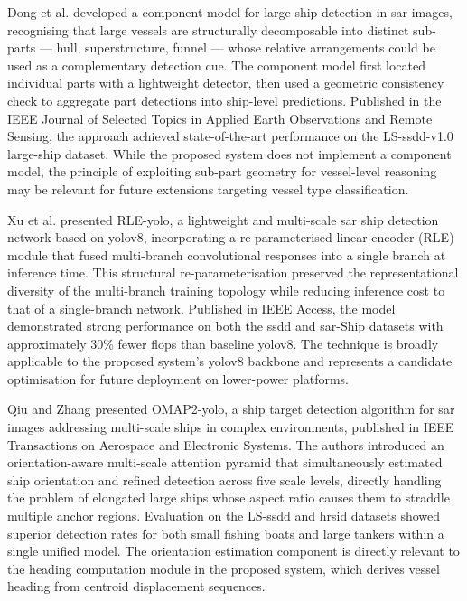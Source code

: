 Dong et al. \cite{Dong2025} developed a component model for large ship detection
in \gls{sar} images, recognising that large vessels are structurally decomposable into
distinct sub-parts --- hull, superstructure, funnel --- whose relative arrangements
could be used as a complementary detection cue. The component model first located
individual parts with a lightweight detector, then used a geometric consistency
check to aggregate part detections into ship-level predictions. Published in the
IEEE Journal of Selected Topics in Applied Earth Observations and Remote Sensing,
the approach achieved state-of-the-art performance on the LS-\gls{ssdd}-v1.0 large-ship
dataset. While the proposed system does not implement a component model, the
principle of exploiting sub-part geometry for vessel-level reasoning may be
relevant for future extensions targeting vessel type classification.
 
Xu et al. \cite{Xu2025} presented RLE-\gls{yolo}, a lightweight and multi-scale \gls{sar}
ship detection network based on \gls{yolov8}, incorporating a re-parameterised linear
encoder (RLE) module that fused multi-branch convolutional responses into a single
branch at inference time. This structural re-parameterisation preserved the
representational diversity of the multi-branch training topology while reducing
inference cost to that of a single-branch network. Published in IEEE Access, the
model demonstrated strong performance on both the \gls{ssdd} and \gls{sar}-Ship datasets with
approximately 30\% fewer \gls{flops} than baseline \gls{yolov8}. The technique is broadly
applicable to the proposed system's \gls{yolov8} backbone and represents a candidate
optimisation for future deployment on lower-power platforms.
 
Qiu and Zhang \cite{Qiu2026} presented OMAP2-\gls{yolo}, a ship target detection
algorithm for \gls{sar} images addressing multi-scale ships in complex environments,
published in IEEE Transactions on Aerospace and Electronic Systems. The authors
introduced an orientation-aware multi-scale attention pyramid that simultaneously
estimated ship orientation and refined detection across five scale levels, directly
handling the problem of elongated large ships whose aspect ratio causes them to
straddle multiple anchor regions. Evaluation on the LS-\gls{ssdd} and \gls{hrsid} datasets
showed superior detection rates for both small fishing boats and large tankers
within a single unified model. The orientation estimation component is directly
relevant to the heading computation module in the proposed system, which derives
vessel heading from centroid displacement sequences.
 
